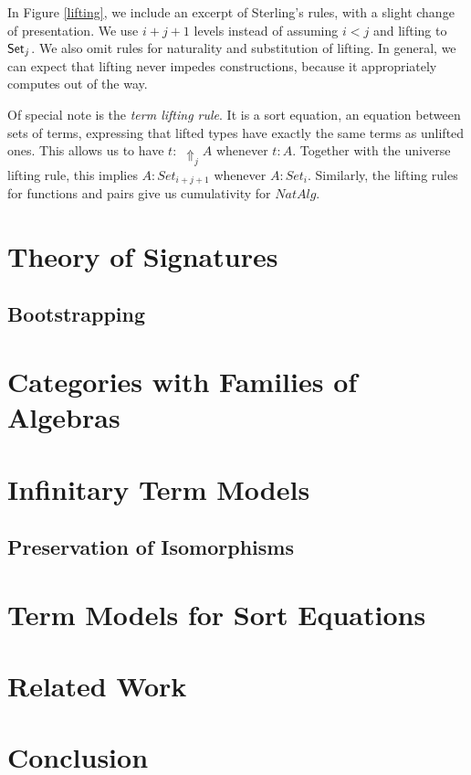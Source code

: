 \documentclass{llncs}
\newcommand{\Lift}{\Uparrow}
\begin{document}
In Figure \ref{lifting}, we include an excerpt of Sterling's rules, with a
slight change of presentation. We use $i+j+1$ levels instead of assuming $i < j$
and lifting to $\mathsf{Set}_j$. We also omit rules for naturality and substitution of
lifting. In general, we can expect that lifting never impedes constructions,
because it appropriately computes out of the way.

Of special note is the \emph{term lifting rule}. It is a sort equation, an
equation between sets of terms, expressing that lifted types have exactly the
same terms as unlifted ones. This allows us to have $t :\,\,\Lift_j A$ whenever $t
: A$. Together with the universe lifting rule, this implies $A : Set_{i+j+1}$
whenever $A : Set_i$. Similarly, the lifting rules for functions and pairs give
us cumulativity for $NatAlg$.





\section{Theory of Signatures}
\label{sec:tos}

\subsection{Bootstrapping}

\section{Categories with Families of Algebras}
\label{sec:cwfmodel}

\section{Infinitary Term Models}
\label{sec:infinitary_term}

\subsection{Preservation of Isomorphisms}

\section{Term Models for Sort Equations}
\label{sec:sort_term}

\section{Related Work}
\label{sec:related}

\section{Conclusion}
\label{sec:conclusion}



\end{document}
